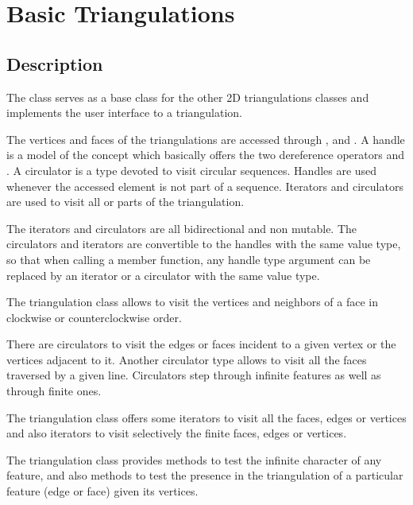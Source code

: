 \section{Basic Triangulations\label{Section_2D_Triangulations_Basic}}

\subsection{Description\label{Subsection_2D_Triangulations_Basic_Description}}

The class 
serves as a base class for the other
2D triangulations classes
and 
 implements the user
interface to a triangulation.




The vertices and faces of the triangulations are accessed through 
,
 and .
A handle is a model of the concept  which basically
offers the two dereference operators  \ccc{*}  and \ccc{->} .
A circulator is a type devoted to visit circular sequences.
Handles are used whenever the accessed element 
is not part of a sequence.
Iterators  and circulators are used
to visit  all or parts of the triangulation.


The iterators and circulators
are all bidirectional and non mutable.
The circulators and iterators are convertible to the 
handles with the same value type, so that 
when calling a member function,
any handle type argument can be replaced
by an iterator or a circulator
with the same value type.

The triangulation class allows to visit the vertices
and  neighbors of a face in clockwise or counterclockwise order. 

There are circulators  
to visit the edges or faces 
incident to a given vertex or the  vertices 
adjacent to it.
Another circulator type allows to visit all the faces
traversed by a given line.
Circulators step through infinite features as well as 
through finite ones. 

The triangulation class offers 
some iterators to visit all the 
faces, edges or vertices and also iterators to visit 
selectively the finite
faces, edges  or vertices.



The triangulation class provides methods to test
the infinite character of any feature,
and also methods to test the presence in the triangulation
of a particular feature (edge or face) given its vertices.

